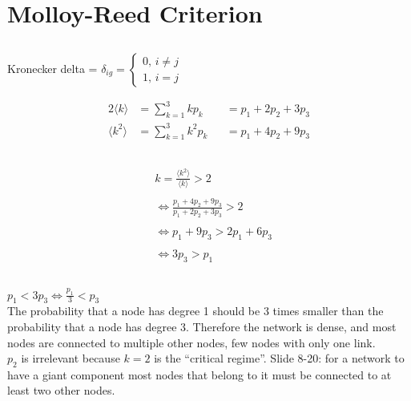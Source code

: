 \documentclass[../document.tex]{subfiles}
\begin{document}
\section{Molloy-Reed Criterion}
\subsection{}
Kronecker delta = $ \delta_{ig} =
\begin{cases}
  0, \, i \neq j \\    
  1, \, i =  j    
\end{cases} $

\begin{alignat*}{2}
\langle k \rangle    &=  \sum\limits^3_{k=1} k p_k    &&=  p_1 + 2 p_2 + 3 p_3 \\
\langle k^2 \rangle  &=  \sum\limits^3_{k=1} k^2 p_k  &&=  p_1 + 4 p_2 + 9 p_3
\end{alignat*}

\subsection{}
\begin{align*}
&k = \frac{ \langle k^2 \rangle }{ \langle k \rangle } > 2      \\ \\
&\iff \frac{ p_1 + 4 p_2 + 9 p_3 }{ p_1 + 2 p_2 + 3 p_3 } > 2   \\ \\
&\iff p_1 + 9 p_3 > 2 p_1 + 6 p_3                               \\ \\
&\iff 3 p_3 > p_1
\end{align*}

\subsection{}
$ p_1 < 3p_3 \iff \frac{p_1}{3} < p_3 $ \\

The probability that a node has degree 1 should be 3 times smaller than the probability that a node has degree 3. Therefore the network is dense, and most nodes are connected to multiple other nodes, few nodes with only one link. \\

$ p_2 $ is irrelevant because $ k = 2 $ is the ``critical regime''. Slide 8-20: for a network to have a giant component most nodes that belong to it must be connected to at least two other nodes.
\end{document}
